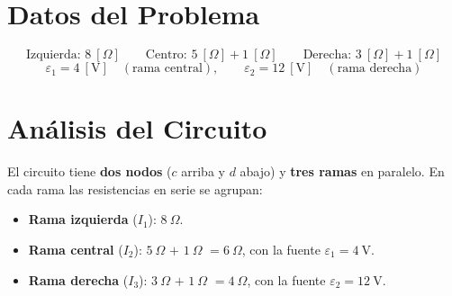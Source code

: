 \documentclass[12pt,letterpaper]{article}
\begin{document}
\begin{center}
\end{center}

\section*{Datos del Problema}

\[
    \text{Izquierda: } 8\ [\Omega] \qquad
    \text{Centro: } 5\ [\Omega] + 1\ [\Omega] \qquad
    \text{Derecha: } 3\ [\Omega] + 1\ [\Omega]
\]
\[
    \varepsilon_1 = 4\ [\text{V}] \quad(\text{rama central}),\qquad
    \varepsilon_2 = 12\ [\text{V}] \quad(\text{rama derecha})
\]

\section*{An\'alisis del Circuito}

El circuito tiene \textbf{dos nodos} ($c$ arriba y $d$ abajo) y \textbf{tres ramas}
en paralelo. En cada rama las resistencias en serie se agrupan:

\begin{itemize}
    \item \textbf{Rama izquierda} ($I_1$): \textcolor{colR1}{$8\ \Omega$}.
    \item \textbf{Rama central} ($I_2$): \textcolor{colR2}{$5\ \Omega$} $+$
          \textcolor{colR3}{$1\ \Omega$} $= 6\ \Omega$, con la fuente
          \textcolor{colE1}{$\varepsilon_1 = 4\ \text{V}$}.
    \item \textbf{Rama derecha} ($I_3$): \textcolor{colR4}{$3\ \Omega$} $+$
          \textcolor{colR5}{$1\ \Omega$} $= 4\ \Omega$, con la fuente
          \textcolor{colE2}{$\varepsilon_2 = 12\ \text{V}$}.
\end{itemize}
\end{document}

